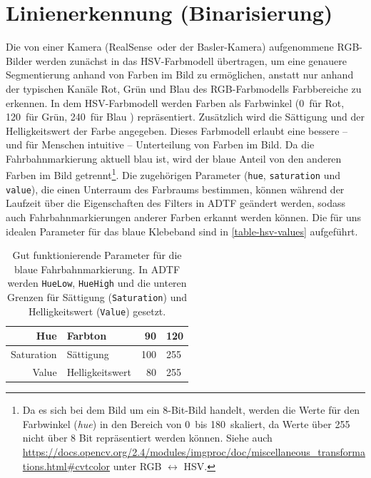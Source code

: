 \documentclass[a4paper,12pt]{report}
\begin{document}
\pagebreak

\section{Linienerkennung (Binarisierung)}
	Die von einer Kamera (RealSense\texttrademark\ oder der Basler-Kamera) aufgenommene RGB-Bilder werden zunächst in das HSV-Farbmodell übertragen, um eine genauere Segmentierung anhand von Farben im Bild zu ermöglichen, anstatt nur anhand der typischen Kanäle Rot, Grün und Blau des RGB-Farbmodells Farbbereiche zu erkennen.
	In dem HSV-Farbmodell werden Farben als Farbwinkel (0\degree\ für Rot, 120\degree\ für Grün, 240\degree\ für Blau \cite{HSV-Wiki}) repräsentiert. Zusätzlich wird die Sättigung und der Helligkeitswert der Farbe angegeben.
	Dieses Farbmodell erlaubt eine bessere -- und für Menschen intuitive -- Unterteilung von Farben im Bild.
	Da die Fahrbahnmarkierung aktuell blau ist, wird der blaue Anteil von den anderen Farben im Bild getrennt\footnote{Da es sich bei dem Bild um ein 8-Bit-Bild handelt, werden die Werte für den Farbwinkel (\textit{hue}) in den Bereich von 0\degree\ bis 180\degree\ skaliert, da Werte über 255 nicht über 8 Bit repräsentiert werden können.
	Siehe auch \url{https://docs.opencv.org/2.4/modules/imgproc/doc/miscellaneous_transformations.html\#cvtcolor} unter RGB $\longleftrightarrow$ HSV.}.
	Die zugehörigen Parameter (\texttt{hue}, \texttt{saturation} und \texttt{value}), die einen Unterraum des Farbraums bestimmen, können während der Laufzeit über die Eigenschaften des Filters in ADTF geändert werden, sodass auch Fahrbahnmarkierungen anderer Farben erkannt werden können.
	Die für uns idealen Parameter für das blaue Klebeband sind in \autoref{table-hsv-values} aufgeführt.

	\begin{table}
		\centering
		\begin{tabular}{r@{\,/\,}l|r@{$-$}l}
			Hue & Farbton & 90 & 120\\\hline
			Saturation & Sättigung & 100 & 255\\\hline
			Value & Helligkeitswert & 80 & 255
		\end{tabular}
		\caption{Gut funktionierende Parameter für die blaue Fahrbahnmarkierung. In ADTF werden \texttt{HueLow}, \texttt{HueHigh} und die unteren Grenzen für Sättigung (\texttt{Saturation}) und Helligkeitswert (\texttt{Value}) gesetzt.}
		\label{table-hsv-values}
	\end{table}
\end{document}

